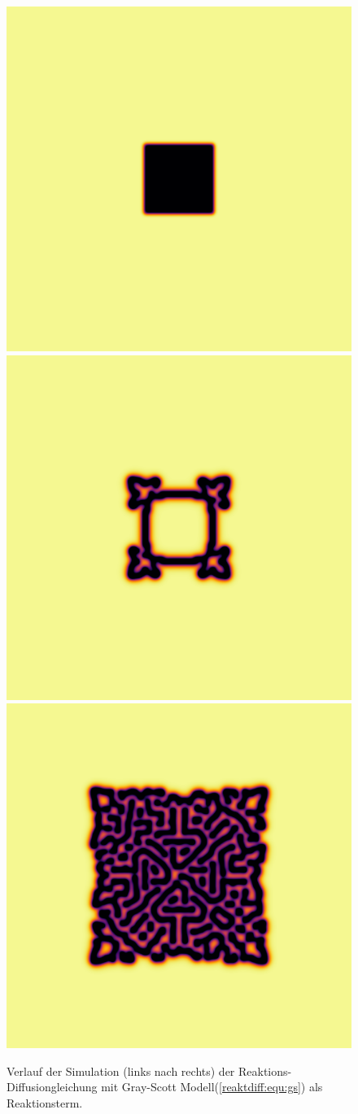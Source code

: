 \begin{figure}
    \centering
    \includegraphics[width=0.32\linewidth]{papers/reaktdiff/images/GrayScott/gs_n1.png}
    \includegraphics[width=0.32\linewidth]{papers/reaktdiff/images/GrayScott/gs_n300.png}
    \includegraphics[width=0.32\linewidth]{papers/reaktdiff/images/GrayScott/gs_n999.png}
    \caption{Verlauf der Simulation (links nach rechts) der Reaktions-Diffusiongleichung mit Gray-Scott Modell(\eqref{reaktdiff:equ:gs}) als Reaktionsterm.}
    \label{reaktdiff:fig:gs}
\end{figure}

